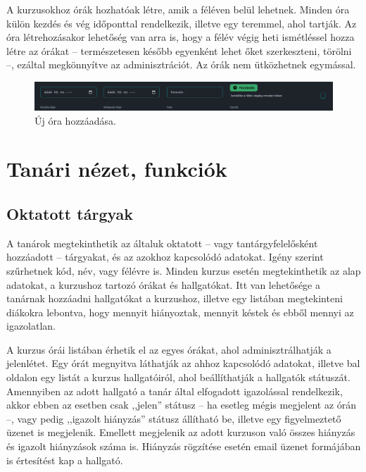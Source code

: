 \documentclass[
]{thesis-ekf}
\theoremstyle{definition}
\theoremstyle{remark}
\begin{document}
A kurzusokhoz órák hozhatóak létre, amik a féléven belül lehetnek. Minden óra külön kezdés és vég időponttal rendelkezik, illetve egy teremmel, ahol tartják. Az óra létrehozásakor lehetőség van arra is, hogy a félév végig heti ismétléssel hozza létre az órákat -- természetesen később egyenként lehet őket szerkeszteni, törölni --, ezáltal megkönnyítve az adminisztrációt. Az órák nem ütközhetnek egymással.

\begin{figure}[ht!]
	\centering
	\includegraphics[width=15.5cm]{../pictures/screenshots/newclass.png}
	\caption{Új óra hozzáadása.}
	\label{newclass}
\end{figure}


\section{Tanári nézet, funkciók}

\subsection{Oktatott tárgyak}
\label{taugthClass}

A tanárok megtekinthetik az általuk oktatott -- vagy tantárgyfelelősként hozzáadott -- tárgyakat, és az azokhoz kapcsolódó adatokat. Igény szerint szűrhetnek kód, név, vagy félévre is. Minden kurzus esetén megtekinthetik az alap adatokat, a kurzushoz tartozó órákat és hallgatókat. Itt van lehetősége a tanárnak hozzáadni hallgatókat a kurzushoz, illetve egy listában megtekinteni diákokra lebontva, hogy mennyit hiányoztak, mennyit késtek és ebből mennyi az igazolatlan.

A kurzus órái listában érhetik el az egyes órákat, ahol adminisztrálhatják a jelenlétet. Egy órát megnyitva láthatják az ahhoz kapcsolódó adatokat, illetve bal oldalon egy listát a kurzus hallgatóiról, ahol beállíthatják a hallgatók státuszát. Amennyiben az adott hallgató a tanár által elfogadott igazolással rendelkezik, akkor ebben az esetben csak ,,jelen'' státusz -- ha esetleg mégis megjelent az órán --, vagy pedig ,,igazolt hiányzás'' státusz állítható be, illetve egy figyelmeztető üzenet is megjelenik. Emellett megjelenik az adott kurzuson való összes hiányzás és igazolt hiányzások száma is. Hiányzás rögzítése esetén email üzenet formájában is értesítést kap a hallgató.
\end{document}
